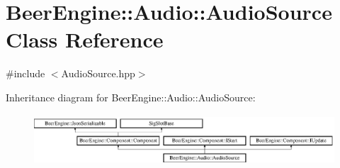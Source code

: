 \hypertarget{class_beer_engine_1_1_audio_1_1_audio_source}{}\section{Beer\+Engine\+:\+:Audio\+:\+:Audio\+Source Class Reference}
\label{class_beer_engine_1_1_audio_1_1_audio_source}


{\ttfamily \#include $<$Audio\+Source.\+hpp$>$}

Inheritance diagram for Beer\+Engine\+:\+:Audio\+:\+:Audio\+Source\+:\begin{figure}[H]
\begin{center}
\leavevmode
\includegraphics[height=1.875000cm]{class_beer_engine_1_1_audio_1_1_audio_source}
\end{center}
\end{figure}
